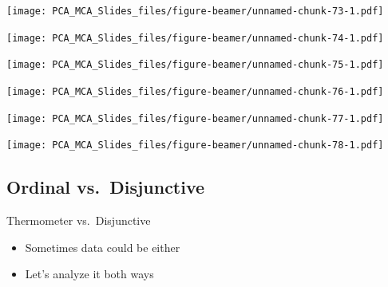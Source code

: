 \documentclass[
  ignorenonframetext,
]{beamer}
\providecommand{\tightlist}{%
  \setlength{\itemsep}{0pt}\setlength{\parskip}{0pt}}
\begin{document}
\begin{frame}

\texttt{[image: PCA\_MCA\_Slides\_files/figure-beamer/unnamed-chunk-73-1.pdf]}

\end{frame}

\begin{frame}

\texttt{[image: PCA\_MCA\_Slides\_files/figure-beamer/unnamed-chunk-74-1.pdf]}

\end{frame}

\begin{frame}

\texttt{[image: PCA\_MCA\_Slides\_files/figure-beamer/unnamed-chunk-75-1.pdf]}

\end{frame}

\begin{frame}

\texttt{[image: PCA\_MCA\_Slides\_files/figure-beamer/unnamed-chunk-76-1.pdf]}

\end{frame}

\begin{frame}

\texttt{[image: PCA\_MCA\_Slides\_files/figure-beamer/unnamed-chunk-77-1.pdf]}

\end{frame}

\begin{frame}

\texttt{[image: PCA\_MCA\_Slides\_files/figure-beamer/unnamed-chunk-78-1.pdf]}

\end{frame}

\hypertarget{ordinal-vs.-disjunctive}{%
\subsection{Ordinal vs.~Disjunctive}\label{ordinal-vs.-disjunctive}}

\begin{frame}{Thermometer vs.~Disjunctive}
\protect\hypertarget{thermometer-vs.-disjunctive}{}

\begin{itemize}[<+->]
\tightlist
\item
  Sometimes data could be either
\item
  Let's analyze it both ways
\end{itemize}

\end{frame}
\end{document}
